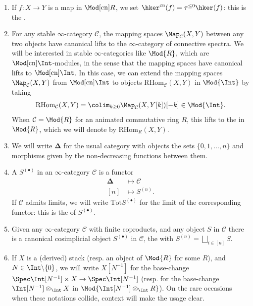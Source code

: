 \documentclass[10pt]{amsart}
\begin{document}
\begin{enumerate}
  \item If $f:X\to Y$ is a map in $\Mod[\mathrm{cn}]{R}$, we set $\hker^{\mathrm{cn}}(f) = \tau^{\leq 0}\hker(f)$: this is the .

  \item For any stable $\infty$-category $\mathcal{C}$, the mapping spaces $\Map_{\mathcal{C}}(X,Y)$ between any two objects have canonical lifts to the $\infty$-category of connective spectra. We will be interested in stable $\infty$-categories like $\Mod{R}$, which are $\Mod[\mathrm{cn}]{\Int}$-modules, in the sense that the mapping spaces have canonical lifts to $\Mod[\mathrm{cn}]{\Int}$. In this case, we can extend the mapping spaces $\Map_{\mathcal{C}}(X,Y)$ from $\Mod[\mathrm{cn}]{\Int}$ to objects $\mathrm{RHom}_{\mathcal{C}}(X,Y)$ in $\Mod{\Int}$ by taking 
  \[
    \mathrm{RHom}_{\mathcal{C}}(X,Y) = \colim_{k\geq 0}\Map_{\mathcal{C}}(X,Y[k])[-k]\in \Mod{\Int}.
  \]
  When $\mathcal{C} = \Mod{R}$ for an animated commutative ring $R$, this lifts to the  in $\Mod{R}$, which we will denote by $\mathrm{RHom}_R(X,Y)$.



  \item We will write $\bm{\Delta}$ for the usual  category with objects the sets $\{0,1,\ldots,n\}$ and morphisms given by the non-decreasing functions between them.

  \item A  $S^{(\bullet)}$ in an $\infty$-category  $\mathcal{C}$ is a functor
  \begin{align*}
  \bm{\Delta}&\mapsto \mathcal{C}\\
  [n]&\mapsto S^{(n)}.
  \end{align*}
  If $\mathcal{C}$ admits limits, we will write $\mathrm{Tot}S^{(\bullet)}$ for the limit of the corresponding functor: this is the  of $S^{(\bullet)}$.
  

  \item Given any $\infty$-category $\mathcal{C}$ with finite coproducts, and any object $S$ in $\mathcal{C}$ there is a canonical cosimplicial object $S^{(\bullet)}$ in $\mathcal{C}$, the  with $S^{(n)} = \bigsqcup_{i\in [n]}S$. 

  \item If $X$ is a (derived) stack (resp. an object of $\Mod{R}$ for some $R$), and $N\in \Int\backslash\{0\}$, we will write $X[N^{-1}]$ for the base-change $\Spec \Int[N^{-1}]\times X\to \Spec \Int[N^{-1}]$ (resp. for the base-change $\Int[N^{-1}]\otimes_{\Int}X$ in $\Mod{\Int[N^{-1}]\otimes_{\Int}R}$). On the rare occasions when these notations collide, context will make the usage clear.
\end{enumerate}
\end{document}
